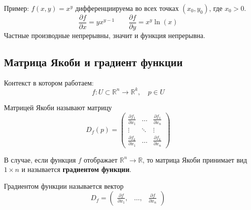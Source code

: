 Пример:
$f(x, y) = x^y$ дифференциируема во всех точках $(x_0, y_0)$, где $x_0 > 0$.
\[\frac{\partial f}{\partial x} = yx^{y-1} \qquad \frac{\partial f}{\partial y} = x^y\ln(x)\]
Частные производные непрерывны, значит и функция непрерывна.

\subsection{Матрица Якоби и градиент функции}
Контекст в котором работаем:
\[f:U \subset \mathbb{R}^{n} \to \mathbb{R}^{k}, \quad p \in U\]
\begin{definition}
Матрицей Якоби называют матрицу
\[D_f(p) = 
\begin{pmatrix}
    \frac{\partial f_1}{\partial x_1} & \ldots & \frac{\partial f_1}{\partial x_n}\\
    \vdots & \ddots & \vdots \\
    \frac{\partial f_k}{\partial x_1} & \dots & \frac{\partial f_k}{\partial x_n}
\end{pmatrix}\]
\end{definition}

В случае, если функция $f$ отображает $\mathbb{R}^n \to \mathbb{R}$, то матрица Якоби принимает вид $1 \times n$ и называется \textbf{градиентом функции}.
\begin{definition}
    Градиентом функции называется вектор 
    \[D_f = 
    \begin{pmatrix}
        \frac{\partial f}{\partial x_1}, & \dots, & \frac{\partial f}{\partial x_n}
    \end{pmatrix}
    \]
\end{definition}
